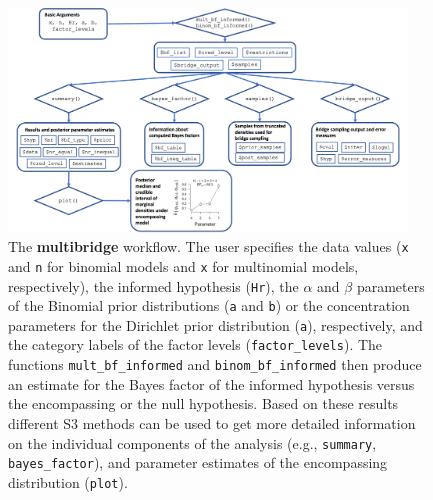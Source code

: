 \documentclass[
  english,
  man,floatsintext]{apa6}
\begin{document}
\begin{figure}
\includegraphics[width=400px]{scheme_multibridge} \caption{The \textbf{multibridge} workflow. The user specifies the data values (\texttt{x} and \texttt{n} for binomial models and \texttt{x} for multinomial models, respectively), the informed hypothesis (\texttt{Hr}), the \(\alpha\) and \(\beta\) parameters of the Binomial prior distributions (\texttt{a} and \texttt{b}) or the concentration parameters for the Dirichlet prior distribution (\texttt{a}), respectively, and the category labels of the factor levels (\texttt{factor\_levels}). The functions \texttt{mult\_bf\_informed} and \texttt{binom\_bf\_informed} then produce an estimate for the Bayes factor of the informed hypothesis versus the encompassing or the null hypothesis. Based on these results different S3 methods can be used to get more detailed information on the individual components of the analysis (e.g., \texttt{summary}, \texttt{bayes\_factor}), and parameter estimates of the encompassing distribution (\texttt{plot}).}\label{fig:scheme-multibridge}
\end{figure}
\end{document}
